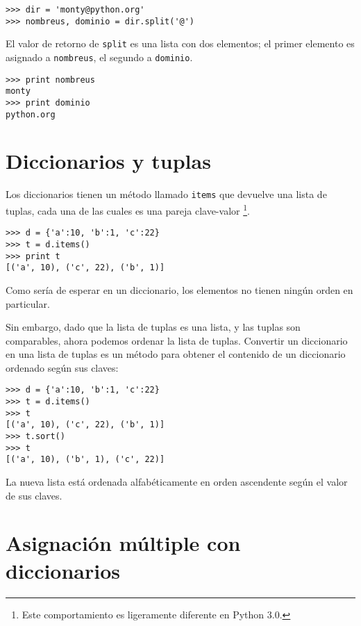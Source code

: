 \beforeverb
\begin{verbatim}
>>> dir = 'monty@python.org'
>>> nombreus, dominio = dir.split('@')
\end{verbatim}
\afterverb
%
El valor de retorno de {\tt split} es una lista con dos elementos;
el primer elemento es asignado a {\tt nombreus}, el segundo a
{\tt dominio}.

\beforeverb
\begin{verbatim}
>>> print nombreus
monty
>>> print dominio
python.org
\end{verbatim}
\afterverb
%

\section{Diccionarios y tuplas}


Los diccionarios tienen un método llamado {\tt items} que devuelve una lista de
tuplas, cada una de las cuales es una pareja clave-valor
\footnote{Este comportamiento es ligeramente diferente en Python 3.0.}.

\beforeverb
\begin{verbatim}
>>> d = {'a':10, 'b':1, 'c':22}
>>> t = d.items()
>>> print t
[('a', 10), ('c', 22), ('b', 1)]
\end{verbatim}
\afterverb
%
Como sería de esperar en un diccionario, los elementos no
tienen ningún orden en particular.

Sin embargo, dado que la lista de tuplas es una lista, y las tuplas
son comparables, ahora podemos ordenar la lista de tuplas. Convertir un diccionario
en una lista de tuplas es un método para obtener el contenido de un
diccionario ordenado según sus claves:

\beforeverb
\begin{verbatim}
>>> d = {'a':10, 'b':1, 'c':22}
>>> t = d.items()
>>> t
[('a', 10), ('c', 22), ('b', 1)]
>>> t.sort()
>>> t
[('a', 10), ('b', 1), ('c', 22)]
\end{verbatim}
\afterverb
%
La nueva lista está ordenada alfabéticamente en orden ascendente según el valor de sus claves.

\section{Asignación múltiple con diccionarios}


